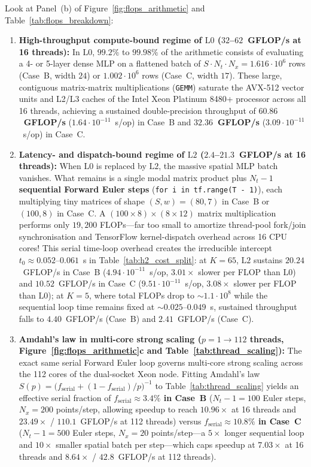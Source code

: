 Look at Panel~(b) of Figure~\ref{fig:flops_arithmetic} and Table~\ref{tab:flops_breakdown}:
\begin{enumerate}[leftmargin=2em]
  \item \textbf{High-throughput compute-bound regime of $\mathrm{L0}$ ($32$--$62$~GFLOP/s at 16 threads):} In $\mathrm{L0}$, $99.2\%$ to $99.98\%$ of the arithmetic consists of evaluating a 4- or 5-layer dense MLP on a flattened batch of $S \cdot N_t \cdot N_x = 1.616\cdot 10^6$ rows (Case~B, width $24$) or $1.002\cdot 10^6$ rows (Case~C, width $17$). These large, contiguous matrix-matrix multiplications (\texttt{GEMM}) saturate the AVX-512 vector units and L2/L3 caches of the Intel Xeon Platinum 8480+ processor across all 16 threads, achieving a sustained double-precision throughput of \textbf{$60.86$~GFLOP/s} ($1.64\cdot 10^{-11}$~s/op) in Case~B and \textbf{$32.36$~GFLOP/s} ($3.09\cdot 10^{-11}$~s/op) in Case~C.
  \item \textbf{Latency- and dispatch-bound regime of $\mathrm{L2}$ ($2.4$--$21.3$~GFLOP/s at 16 threads):} When $\mathrm{L0}$ is replaced by $\mathrm{L2}$, the massive spatial MLP batch vanishes. What remains is a single modal matrix product plus $N_t - 1$ \textbf{sequential Forward Euler steps} (\texttt{for i in tf.range(T - 1)}), each multiplying tiny matrices of shape $(S, w) = (80, 7)$ in Case~B or $(100, 8)$ in Case~C. A $(100 \times 8) \times (8 \times 12)$ matrix multiplication performs only $19{,}200$ FLOPs---far too small to amortize thread-pool fork/join synchronisation and TensorFlow kernel-dispatch overhead across 16 CPU cores! This serial time-loop overhead creates the irreducible intercept $t_0 \approx 0.052$--$0.061$~s in Table~\ref{tab:h2_cost_split}: at $K=65$, $\mathrm{L2}$ sustains $20.24$~GFLOP/s in Case~B ($4.94\cdot 10^{-11}$~s/op, $3.01\times$ slower per FLOP than $\mathrm{L0}$) and $10.52$~GFLOP/s in Case~C ($9.51\cdot 10^{-11}$~s/op, $3.08\times$ slower per FLOP than $\mathrm{L0}$); at $K=5$, where total FLOPs drop to $\sim 1.1\cdot 10^8$ while the sequential loop time remains fixed at $\sim 0.025$--$0.049$~s, sustained throughput falls to $4.40$~GFLOP/s (Case~B) and $2.41$~GFLOP/s (Case~C).
  \item \textbf{Amdahl's law in multi-core strong scaling ($p = 1 \to 112$ threads, Figure~\ref{fig:flops_arithmetic}c and Table~\ref{tab:thread_scaling}):} The exact same serial Forward Euler loop governs multi-core strong scaling across the 112 cores of the dual-socket Xeon node. Fitting Amdahl's law $S(p) = \big(f_{\mathrm{serial}} + (1 - f_{\mathrm{serial}})/p\big)^{-1}$ to Table~\ref{tab:thread_scaling} yields an effective serial fraction of \textbf{$f_{\mathrm{serial}} \approx 3.4\%$ in Case~B} ($N_t - 1 = 100$ Euler steps, $N_x = 200$ points/step, allowing speedup to reach $10.96\times$ at 16 threads and $23.49\times$ / $110.1$~GFLOP/s at 112 threads) versus \textbf{$f_{\mathrm{serial}} \approx 10.8\%$ in Case~C} ($N_t - 1 = 500$ Euler steps, $N_x = 20$ points/step---a $5\times$ longer sequential loop and $10\times$ smaller spatial batch per step---which caps speedup at $7.03\times$ at 16 threads and $8.64\times$ / $42.8$~GFLOP/s at 112 threads).

\end{enumerate}
